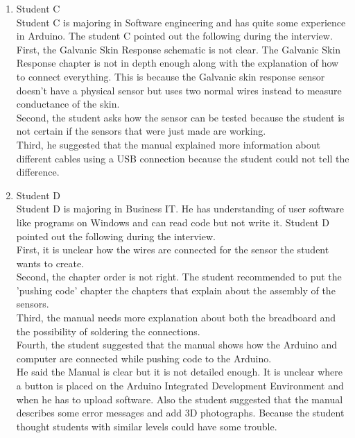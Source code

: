\documentclass[conference]{IEEEtran}
\begin{document}
\begin{figure*}[ht]
\begin{enumerate}
\begin{enumerate}
\begin{figure*}[!ht]
\begin{enumerate}
\begin{enumerate}
					
					\item Student C\\
					Student C is majoring in Software engineering and has  quite some experience in Arduino. The student C pointed out the following during the interview.\\
					First, the Galvanic Skin Response schematic is not clear. The Galvanic Skin Response chapter is not in depth enough along with the explanation of how to connect everything. This is because the Galvanic skin response sensor doesn't have a physical sensor but uses two normal wires instead to measure conductance of the skin.\\
					Second, the student asks how the sensor can be tested because the student is not certain if the sensors that were just made are working.\\
					Third, he suggested that the manual explained more information about different cables using a USB connection because the student could not tell the difference.\\

					\item Student D\\
					Student D is majoring in Business IT. He has understanding of user software like programs on Windows and can read code but not write it. Student D pointed out the following during the interview.\\
					First, it is unclear how the wires are connected for the sensor the student wants to create.\\
					Second, the chapter order is not right. The student recommended to put the 'pushing code' chapter the chapters that explain about the assembly of the sensors.\\
					Third, the manual needs more explanation about both the breadboard and the possibility of soldering the connections.\\
					Fourth, the student suggested that the manual shows how the Arduino and computer are connected while pushing code to the Arduino.\\
					He said the Manual is clear but it is not detailed enough. It is unclear where a button is placed on the Arduino Integrated Development Environment and when he has to upload software. Also the student suggested that the manual describes some error messages and add 3D photographs. Because the student thought students with similar levels could have some trouble. 
					

\end{enumerate}
\end{enumerate}
\end{figure*}
\end{enumerate}
\end{enumerate}
\end{figure*}
\end{document}
